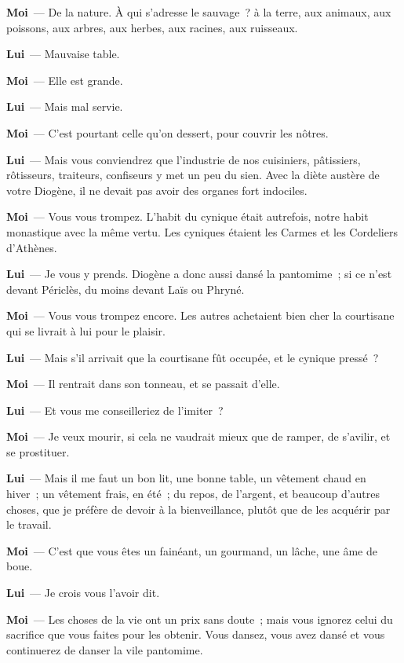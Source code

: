 \documentclass[french,twoside]{book} %
\newcommand{\labelchar}[1]{\textbf{\color{rubric} #1}}
\begin{document}
\labelchar{Moi} — De la nature. À qui s’adresse le sauvage ? à la terre, aux animaux, aux poissons, aux arbres, aux herbes, aux racines, aux ruisseaux.\par
\labelchar{Lui} — Mauvaise table.\par
\labelchar{Moi} — Elle est grande.\par
\labelchar{Lui} — Mais mal servie.\par
\labelchar{Moi} — C’est pourtant celle qu’on dessert, pour couvrir les nôtres.\par
\labelchar{Lui} — Mais vous conviendrez que l’industrie de nos cuisiniers, pâtissiers, rôtisseurs, traiteurs, confiseurs y met un peu du sien. Avec la diète austère de votre Diogène, il ne devait pas avoir des organes fort indociles.\par
\labelchar{Moi} — Vous vous trompez. L’habit du cynique était autrefois, notre habit monastique avec la même vertu. Les cyniques étaient les Carmes et les Cordeliers d’Athènes.\par
\labelchar{Lui} — Je vous y prends. Diogène a donc aussi dansé la pantomime ; si ce n’est devant Périclès, du moins devant Laïs ou Phryné.\par
\labelchar{Moi} — Vous vous trompez encore. Les autres achetaient bien cher la courtisane qui se livrait à lui pour le plaisir.\par
\labelchar{Lui} — Mais s’il arrivait que la courtisane fût occupée, et le cynique pressé ?\par
\labelchar{Moi} — Il rentrait dans son tonneau, et se passait d’elle.\par
\labelchar{Lui} — Et vous me conseilleriez de l’imiter ?\par
\labelchar{Moi} — Je veux mourir, si cela ne vaudrait mieux que de ramper, de s’avilir, et se prostituer.\par
\labelchar{Lui} — Mais il me faut un bon lit, une bonne table, un vêtement chaud en hiver ; un vêtement frais, en été ; du repos, de l’argent, et beaucoup d’autres choses, que je préfère de devoir à la bienveillance, plutôt que de les acquérir par le travail.\par
\labelchar{Moi} — C’est que vous êtes un fainéant, un gourmand, un lâche, une âme de boue.\par
\labelchar{Lui} — Je crois vous l’avoir dit.\par
\labelchar{Moi} — Les choses de la vie ont un prix sans doute ; mais vous ignorez celui du sacrifice que vous faites pour les obtenir. Vous dansez, vous avez dansé et vous continuerez de danser la vile pantomime.\par
\end{document}
